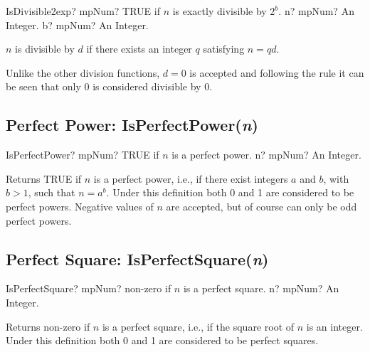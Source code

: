 \begin{mpFunctionsExtract}
	\mpFunctionTwo
	{IsDivisible2exp? mpNum? TRUE if $n$ is exactly divisible by $2^b$.}
	{n? mpNum? An Integer.}
	{b? mpNum? An Integer.}
\end{mpFunctionsExtract}

\vspace{0.3cm}

$n$ is divisible by $d$ if there exists an integer $q$ satisfying $n = qd$. 

Unlike the other division functions, $d = 0$ is accepted and following the rule it can be seen that only 0 is considered divisible by 0.




\subsection{Perfect Power: IsPerfectPower(\textit{n})}

\begin{mpFunctionsExtract}
	\mpFunctionOne
	{IsPerfectPower? mpNum? TRUE if $n$ is a perfect power.}
	{n? mpNum? An Integer.}
\end{mpFunctionsExtract}

\vspace{0.3cm}
Returns TRUE if $n$ is a perfect power, i.e., if there exist integers $a$ and $b$, with $b > 1$, such that $n = a^b$.
Under this definition both 0 and 1 are considered to be perfect powers. Negative values of $n$ are accepted, but of course can only be odd perfect powers.





\subsection{Perfect Square: IsPerfectSquare(\textit{n})}

\begin{mpFunctionsExtract}
	\mpFunctionOne
	{IsPerfectSquare? mpNum? non-zero if $n$ is a perfect square.}
	{n? mpNum? An Integer.}
\end{mpFunctionsExtract}

\vspace{0.3cm}
Returns non-zero if $n$ is a perfect square, i.e., if the square root of $n$ is an integer. Under this definition both 0 and 1 are considered to be perfect squares.








